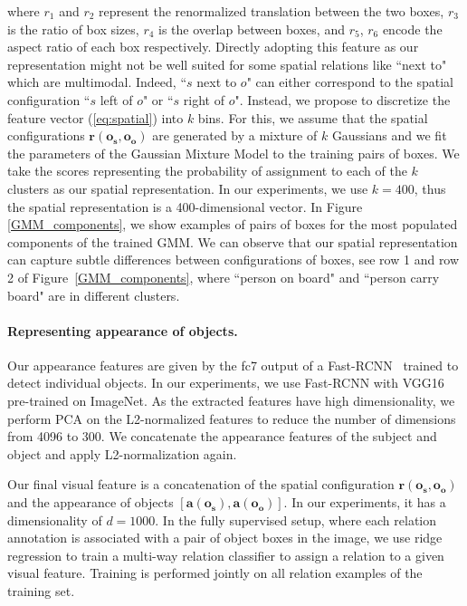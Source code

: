 \documentclass[10pt,twocolumn,letterpaper]{article}
\newcommand{\spaceparagraph}{\vspace{-.35cm}}
\newcommand{\gotoline}{\vspace{.05cm}}
\begin{document}
\noindent where $r_1$ and $r_2$ represent the renormalized translation between the two boxes, $r_3$ is the ratio of box sizes, $r_4$ is the overlap between boxes, and $r_5$, $r_6$ encode the aspect ratio of each box respectively. Directly adopting this feature as our representation might not be well suited for some spatial relations like ``next to" which are multimodal. Indeed, ``$s$ next to $o$" can either correspond to the spatial configuration ``$s$ left of $o$" or ``$s$ right of $o$". Instead, we propose to discretize the feature vector (\ref{eq:spatial}) into $k$ bins. For this, we assume that the spatial configurations $\bm{r}(\bm{o_s},\bm{o_o})$ are generated by a mixture of $k$ Gaussians and we fit the parameters of the Gaussian Mixture Model to the training pairs of boxes. We take the scores representing the probability of assignment to each of the $k$ clusters as our spatial representation. In our experiments, we use $k=400$, thus the spatial representation is a 400-dimensional vector. In Figure \ref{GMM_components}, we show examples of pairs of boxes for the most populated components of the trained GMM. We can observe that our spatial representation can capture subtle differences between configurations of boxes, see row 1 and row 2 of Figure~\ref{GMM_components}, where ``person on board" and ``person carry board" are in different clusters.
  
\spaceparagraph
\paragraph{Representing appearance of objects.} 
Our appearance features are given by the fc7 output of a Fast-RCNN~\cite{girshick15fastrcnn} trained to detect individual objects. In our experiments, we use Fast-RCNN with VGG16 pre-trained on ImageNet. As the extracted features have high dimensionality, we perform PCA on the L2-normalized features to reduce the number of dimensions from 4096 to 300. We concatenate the appearance features of the subject and object and apply L2-normalization again. 

\gotoline
\vspace{4pt}
Our final visual feature is a concatenation of the spatial configuration $\bm{r}(\bm{o_s},\bm{o_o})$ and the appearance of objects $[\bm{a}(\bm{o_s}), \bm{a}(\bm{o_o})]$. In our experiments, it has a dimensionality of $d=1000$. 
In the fully supervised setup, where each relation annotation is associated with a pair of object boxes in the image, we use ridge regression to train a multi-way relation classifier to assign a relation to a given 
visual feature. Training is performed jointly on all relation examples of the training set.
\end{document}
